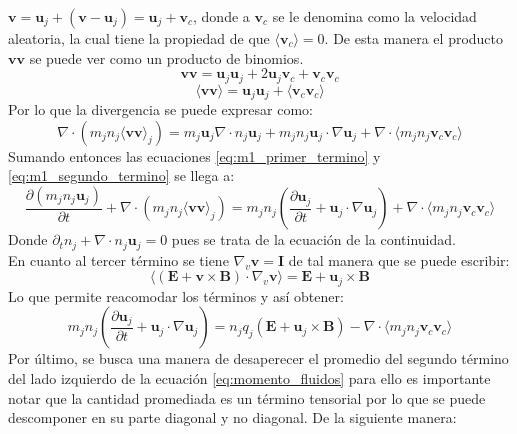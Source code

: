 \documentclass[../tesis_main_file.tex]{subfiles}
\begin{document}
$\textbf{v}=\textbf{u}_j+(\textbf{v}-\textbf{u}_j)=\textbf{u}_j+\textbf{v}_c$, donde a $\textbf{v}_c$ se le denomina como la velocidad aleatoria, la cual tiene la propiedad de que $\langle \textbf{v}_c \rangle=0$.
De esta manera el producto $\textbf{v}\textbf{v}$ se puede ver como un producto de binomios.
\begin{equation}
\textbf{v}\textbf{v}=\textbf{u}_j \textbf{u}_j + 2\textbf{u}_j \textbf{v}_c + \textbf{v}_c \textbf{v}_c
\end{equation}
\begin{equation}
\langle \textbf{v} \textbf{v} \rangle = \textbf{u}_j \textbf{u}_j +\langle \textbf{v}_c \textbf{v}_c \rangle
\end{equation}
Por lo que la divergencia se puede expresar como:
\begin{equation}
\label{eq:m1_segundo_termino}
\nabla \cdot (m_jn_j\langle \textbf{v}\textbf{v} \rangle_j)=m_j \textbf{u}_j\nabla \cdot n_j \textbf{u}_j+m_jn_j\textbf{u}_j\cdot \nabla \textbf{u}_j+\nabla \cdot \langle m_jn_j \textbf{v}_c \textbf{v}_c \rangle
\end{equation}
Sumando entonces las ecuaciones \ref{eq:m1_primer_termino} y \ref{eq:m1_segundo_termino} se llega a:
\begin{equation}
\frac{\partial (m_jn_j\textbf{u}_j)}{\partial t}+\nabla \cdot (m_jn_j\langle \textbf{v}\textbf{v} \rangle_j)=m_jn_j \left( \frac{\partial \textbf{u}_j}{\partial t}+\textbf{u}_j\cdot \nabla \textbf{u}_j \right)+ \nabla \cdot \langle m_jn_j \textbf{v}_c \textbf{v}_c \rangle
\end{equation}
Donde $\partial_t n_j+\nabla \cdot n_j \textbf{u}_j=0$ pues se trata de la ecuación de la continuidad.\\
En cuanto al tercer término se tiene $\nabla _v \textbf{v}=\textbf{I}$ de tal manera que se puede escribir:
\begin{equation}
\langle (\textbf{E}+\textbf{v}\times \textbf{B})\cdot \nabla_v\textbf{v}\rangle = \textbf{E}+\textbf{u}_j\times \textbf{B}
\end{equation}
Lo que permite reacomodar los términos y así obtener:
\begin{equation}
\label{eq:momento_fluidos}
m_jn_j \left( \frac{\partial \textbf{u}_j}{\partial t}+\textbf{u}_j\cdot \nabla \textbf{u}_j \right)= n_jq_j(\textbf{E}+\textbf{u}_j\times \textbf{B})- \nabla \cdot \langle m_jn_j \textbf{v}_c \textbf{v}_c \rangle
\end{equation}
Por último, se busca una manera de desaperecer el promedio del segundo término del lado izquierdo de la ecuación \ref{eq:momento_fluidos} para ello es importante notar que la cantidad promediada es un término tensorial por lo que se puede descomponer en su parte diagonal y no diagonal. De la siguiente manera:
\end{document}
